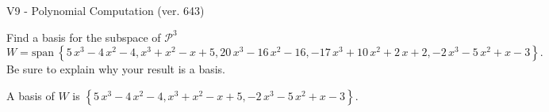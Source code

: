 \begin{exercise}
  \begin{exerciseTitle}V9 - Polynomial Computation (ver. 643)\end{exerciseTitle}
  \begin{exerciseStatement}
    Find a basis for the subspace of \(\mathcal{P}^3\) 
\[W=\mathrm{span}\ \left\{5 \, x^{3} - 4 \, x^{2} - 4 , x^{3} + x^{2} - x + 5 , 20 \, x^{3} - 16 \, x^{2} - 16 , -17 \, x^{3} + 10 \, x^{2} + 2 \, x + 2 , -2 \, x^{3} - 5 \, x^{2} + x - 3\right\}.\]
 Be sure to explain why your result is a basis.


  \end{exerciseStatement}
  \begin{exerciseAnswer}
   A basis of \(W\) is  \(\left\{5 \, x^{3} - 4 \, x^{2} - 4 , x^{3} + x^{2} - x + 5 , -2 \, x^{3} - 5 \, x^{2} + x - 3\right\}\).
  


  \end{exerciseAnswer}
\end{exercise}